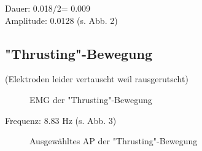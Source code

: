 Dauer: 0.018/2= 0.009\\
Amplitude: 0.0128 (s. Abb. 2)

\subsection{"{}Thrusting"{}-Bewegung}
(Elektroden leider vertauscht weil rausgerutscht)
\begin{figure}[H]
\caption{EMG der "{}Thrusting"{}-Bewegung}
\label{thrust}
\end{figure}
Frequenz: 8.83 Hz (s. Abb. 3)

\begin{figure}[H]
\caption{Ausgewähltes AP der "{}Thrusting"{}-Bewegung}
\label{thrust-ap}
\end{figure}



